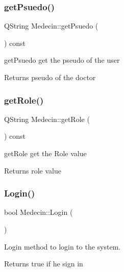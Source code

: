 \subsubsection{\texorpdfstring{getPsuedo()}{getPsuedo()}}
{\footnotesize\ttfamily Q\+String Medecin\+::get\+Psuedo (\begin{DoxyParamCaption}{ }\end{DoxyParamCaption}) const}



get\+Psuedo get the pseudo of the user 

\begin{DoxyReturn}{Returns}
pseudo of the doctor 
\end{DoxyReturn}
\mbox{\label{class_medecin_a10a0e712d72febbe4a509e277cea94bf}} 
\subsubsection{\texorpdfstring{getRole()}{getRole()}}
{\footnotesize\ttfamily Q\+String Medecin\+::get\+Role (\begin{DoxyParamCaption}{ }\end{DoxyParamCaption}) const}



get\+Role get the Role value 

\begin{DoxyReturn}{Returns}
role value 
\end{DoxyReturn}
\mbox{\label{class_medecin_a01e4a472a632ecbbff5875f82887d3f1}} 
\subsubsection{\texorpdfstring{Login()}{Login()}}
{\footnotesize\ttfamily bool Medecin\+::\+Login (\begin{DoxyParamCaption}{ }\end{DoxyParamCaption})}



Login method to login to the system. 

\begin{DoxyReturn}{Returns}
true if he sign in 
\end{DoxyReturn}
\mbox{\label{class_medecin_a2578faa446f961f05dc8578d1cf706d9}} 
